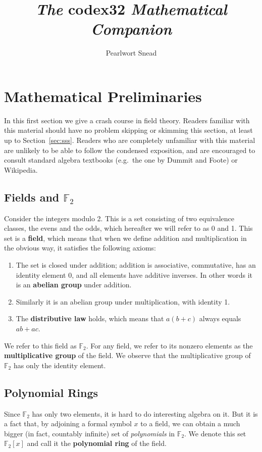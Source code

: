 \documentclass[letterpaper]{article}
\title{
    \emph{The} codex32 \emph{Mathematical Companion}
}
\author{Pearlwort Snead}
\date{
}
\newcommand{\ftwo}{\mathbb{F}_2}
\begin{document}
\maketitle
\tableofcontents

\section{Mathematical Preliminaries}

In this first section we give a crash course in field theory. Readers familiar
with this material should have no problem skipping or skimming this section,
at least up to Section~\ref{sec:sss}.
Readers who are completely unfamiliar with this material are unlikely to be
able to follow the condensed exposition, and are encouraged to consult
standard algebra textbooks (e.g.~the one by Dummit and Foote) or Wikipedia.

\subsection{Fields and $\ftwo$}
Consider the integers modulo 2. This is a set consisting of two equivalence
classes, the evens and the odds, which hereafter we will refer to as 0 and 1.
This set is a \textbf{field}, which means that when we define addition and
multiplication in the obvious way, it satisfies the following axioms:
\begin{enumerate}
\item The set is closed under addition; addition is associative, commutative,
has an identity element 0, and all elements have additive inverses. In other
words it is an \textbf{abelian group} under addition.
\item Similarly it is an abelian group under multiplication, with identity 1.
\item The \textbf{distributive law} holds, which means that $a(b + c)$ always
equals $ab + ac$.
\end{enumerate}

We refer to this field as $\ftwo$. For any field, we refer to its nonzero
elements as the \textbf{multiplicative group} of the field. We observe that
the multiplicative group of $\ftwo$ has only the identity element.

\subsection{Polynomial Rings}

Since $\ftwo$ has only two elements, it is hard to do interesting algebra on
it. But it is a fact that, by adjoining a formal symbol $x$ to a field, we
can obtain a much bigger (in fact, countably infinite) set of \emph{polynomials}
in $\ftwo$. We denote this set $\ftwo[x]$ and call it the \textbf{polynomial
ring} of the field.
\end{document}
